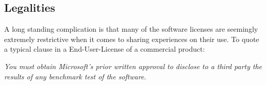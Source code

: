 \documentclass{cidr-2019}
\begin{document}
\subsection{Legalities\label{legalities}}






A long standing complication is that many of the software licenses are seemingly extremely restrictive when it comes to sharing experiences on their use. To quote a typical clause in a End-User-License of a commercial product:

\emph{ You must obtain Microsoft's prior written approval to disclose to a third party the results of any benchmark test of the software.}
\end{document}
